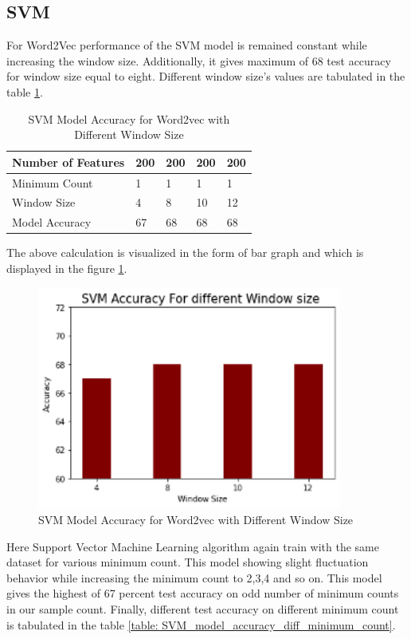 \subsection{SVM}
For Word2Vec performance of the SVM model is remained constant while increasing the window size. Additionally, it gives maximum of 68 test accuracy for window size equal to eight. Different window size’s values are tabulated in the table \ref{table:SVM_model_accuracy_diff_window_size}.
\begin{center}
\begin{table}[H]
\caption{SVM Model Accuracy for Word2vec with Different Window Size}
\label{table:SVM_model_accuracy_diff_window_size}
\centering
\begin{tabular}{ |p{4cm}|p{2cm}|p{2cm}|p{2cm}|p{2cm}|  }
 \hline
 Number of Features & 200 &200 &200 &200  \\
 \hline
 Minimum Count   & 1 &1 &1 &1    \\
 \hline
 Window Size &4 &8 &10 &12 \\
 \hline
 Model Accuracy &67 &68 &68 &68 \\
 \hline
\end{tabular}
\end{table}
\end{center}
The above calculation is visualized in the form of bar graph and which is displayed in the figure \ref{fig:bargraph_SVM_model_accuracy_diff_window_size}.
\begin{figure}[H]
	\centering 
	\vspace{20pt}\includegraphics[width=10cm]{images/SVM_accuracy_for_different_window.png}
	\caption{SVM Model Accuracy for Word2vec with Different Window Size} 
	\label{fig:bargraph_SVM_model_accuracy_diff_window_size}
\end{figure}
Here Support Vector Machine Learning algorithm again train with the same dataset for various minimum count. This model showing slight fluctuation behavior while increasing the minimum count to 2,3,4 and so on. This model gives the highest of 67 percent test accuracy on odd number of minimum counts in our sample count. Finally, different test accuracy on different minimum count is tabulated in the table \ref{table: SVM_model_accuracy_diff_minimum_count}.
